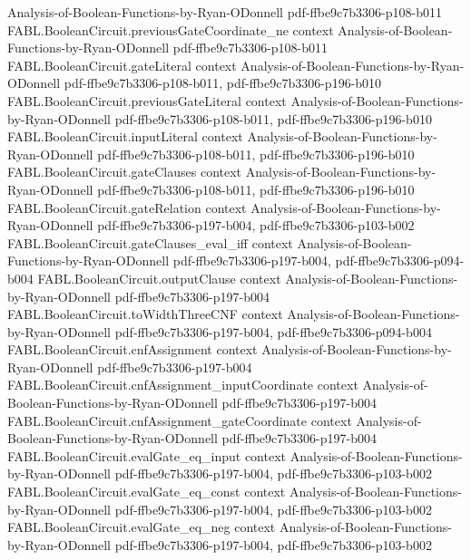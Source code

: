\begin{theorem}
  {Analysis-of-Boolean-Functions-by-Ryan-ODonnell}
  {pdf-ffbe9c7b3306-p108-b011}
\proofstep
  {FABL.BooleanCircuit.previousGateCoordinate_ne}
  {context}
  {Analysis-of-Boolean-Functions-by-Ryan-ODonnell}
  {pdf-ffbe9c7b3306-p108-b011}
\proofstep
  {FABL.BooleanCircuit.gateLiteral}
  {context}
  {Analysis-of-Boolean-Functions-by-Ryan-ODonnell}
  {pdf-ffbe9c7b3306-p108-b011,
    pdf-ffbe9c7b3306-p196-b010}
\proofstep
  {FABL.BooleanCircuit.previousGateLiteral}
  {context}
  {Analysis-of-Boolean-Functions-by-Ryan-ODonnell}
  {pdf-ffbe9c7b3306-p108-b011,
    pdf-ffbe9c7b3306-p196-b010}
\proofstep
  {FABL.BooleanCircuit.inputLiteral}
  {context}
  {Analysis-of-Boolean-Functions-by-Ryan-ODonnell}
  {pdf-ffbe9c7b3306-p108-b011,
    pdf-ffbe9c7b3306-p196-b010}
\proofstep
  {FABL.BooleanCircuit.gateClauses}
  {context}
  {Analysis-of-Boolean-Functions-by-Ryan-ODonnell}
  {pdf-ffbe9c7b3306-p108-b011,
    pdf-ffbe9c7b3306-p196-b010}
\proofstep
  {FABL.BooleanCircuit.gateRelation}
  {context}
  {Analysis-of-Boolean-Functions-by-Ryan-ODonnell}
  {pdf-ffbe9c7b3306-p197-b004,
    pdf-ffbe9c7b3306-p103-b002}
\proofstep
  {FABL.BooleanCircuit.gateClauses_eval_iff}
  {context}
  {Analysis-of-Boolean-Functions-by-Ryan-ODonnell}
  {pdf-ffbe9c7b3306-p197-b004,
    pdf-ffbe9c7b3306-p094-b004}
\proofstep
  {FABL.BooleanCircuit.outputClause}
  {context}
  {Analysis-of-Boolean-Functions-by-Ryan-ODonnell}
  {pdf-ffbe9c7b3306-p197-b004}
\proofstep
  {FABL.BooleanCircuit.toWidthThreeCNF}
  {context}
  {Analysis-of-Boolean-Functions-by-Ryan-ODonnell}
  {pdf-ffbe9c7b3306-p197-b004,
    pdf-ffbe9c7b3306-p094-b004}
\proofstep
  {FABL.BooleanCircuit.cnfAssignment}
  {context}
  {Analysis-of-Boolean-Functions-by-Ryan-ODonnell}
  {pdf-ffbe9c7b3306-p197-b004}
\proofstep
  {FABL.BooleanCircuit.cnfAssignment_inputCoordinate}
  {context}
  {Analysis-of-Boolean-Functions-by-Ryan-ODonnell}
  {pdf-ffbe9c7b3306-p197-b004}
\proofstep
  {FABL.BooleanCircuit.cnfAssignment_gateCoordinate}
  {context}
  {Analysis-of-Boolean-Functions-by-Ryan-ODonnell}
  {pdf-ffbe9c7b3306-p197-b004}
\proofstep
  {FABL.BooleanCircuit.evalGate_eq_input}
  {context}
  {Analysis-of-Boolean-Functions-by-Ryan-ODonnell}
  {pdf-ffbe9c7b3306-p197-b004,
    pdf-ffbe9c7b3306-p103-b002}
\proofstep
  {FABL.BooleanCircuit.evalGate_eq_const}
  {context}
  {Analysis-of-Boolean-Functions-by-Ryan-ODonnell}
  {pdf-ffbe9c7b3306-p197-b004,
    pdf-ffbe9c7b3306-p103-b002}
\proofstep
  {FABL.BooleanCircuit.evalGate_eq_neg}
  {context}
  {Analysis-of-Boolean-Functions-by-Ryan-ODonnell}
  {pdf-ffbe9c7b3306-p197-b004,
    pdf-ffbe9c7b3306-p103-b002}

\end{theorem}
